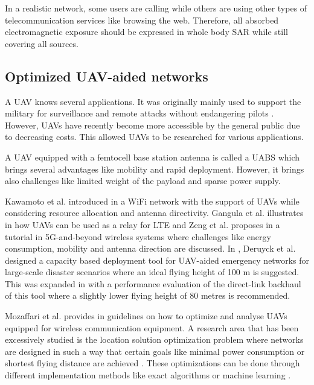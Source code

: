 \documentclass[twocolumn]{phdsymp} %
\begin{document}
In a realistic network, some users are calling while others are using other types of telecommunication services like browsing the web.
Therefore, all absorbed electromagnetic exposure should be expressed in whole body SAR while still covering all sources.

\subsection{Optimized \gls{UAV}-aided networks}

A \gls{UAV} knows several applications. It was originally mainly used to support the military for surveillance and remote attacks without 
endangering pilots \cite{U12}. However, \gls{UAV}s have recently become more accessible by the general public due to decreasing costs. This 
allowed \gls{UAV}s to be researched for various applications.

A \gls{UAV} equipped with a femtocell base station antenna is called a \gls{UABS}
which brings several advantages like mobility and rapid deployment. 
However, it brings also challenges like limited weight of the payload and sparse power supply.

Kawamoto et al. introduced in \cite{U11} a WiFi network with the support of  \gls{UAV}s while considering resource allocation 
and antenna directivity. 
Gangula et al. illustrates in \cite{U10} how \gls{UAV}s can be used as a relay for \gls{LTE}
and
Zeng et al. proposes in  \cite{U12} a tutorial in 5G-and-beyond wireless systems where challenges like 
energy consumption, mobility and antenna direction are discussed. 
In \cite{J2}, Deruyck et al. designed  a capacity based deployment tool for UAV-aided emergency
networks for large-scale disaster scenarios where an ideal flying height of 100 m is suggested. This was expanded 
in \cite{U1} with a performance evaluation of the direct-link backhaul of this tool where a slightly lower 
flying height of 80 metres is recommended.

Mozaffari et al. provides in \cite{U3} guidelines on how to optimize and analyse \gls{UAV}s equipped for 
wireless communication equipment.
A research area that has been excessively studied is the location solution optimization problem where networks are 
designed in such a way that certain goals like minimal power consumption or shortest flying distance are achieved \cite{U6,U7,U8,U9}.
These optimizations can be done through different implementation methods like exact algorithms or machine learning \cite{U3,U5}.
\end{document}
